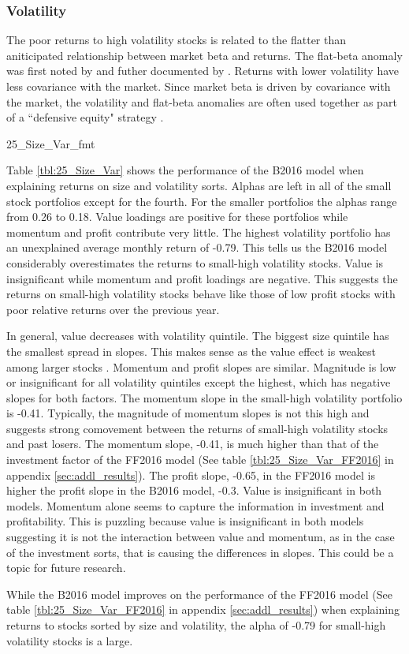 
\subsubsection{Volatility}

The poor returns to high volatility stocks is related to the flatter than aniticipated
relationship between market beta and returns. The flat-beta anomaly was first noted by
\textcite{jensen1972capital} and futher documented by \textcite{fama1973risk}. Returns
with lower volatility have less covariance with the market. Since market beta is driven by
covariance with the market, the volatility and flat-beta anomalies are often used together
as part of a ``defensive equity" strategy \parencite{frazzini2014betting}.

{25_Size_Var_fmt}

Table \ref{tbl:25_Size_Var} shows the performance of the B2016 model when
explaining returns on size and volatility sorts. Alphas are left in all of the small stock
portfolios except for the fourth. For the smaller portfolios the alphas range from 0.26 to
0.18. Value loadings are positive for these portfolios while momentum and profit
contribute very little. The highest volatility portfolio has an unexplained average
monthly return of -0.79. This tells us the B2016 model considerably overestimates the
returns to small-high volatility stocks. Value is insignificant while momentum and profit
loadings are negative. This suggests the returns on small-high volatility stocks behave
like those of low profit stocks with poor relative returns over the previous year.

In general, value decreases with volatility quintile. The biggest size quintile has the
smallest spread in slopes. This makes sense as the value effect is weakest among larger
stocks \parencite{asness2015fact}. Momentum and profit slopes are similar. Magnitude is
low or insignificant for all volatility quintiles except the highest, which has negative
slopes for both factors. The momentum slope in the small-high volatility portfolio is
-0.41. Typically, the magnitude of momentum slopes is not this high and suggests strong
comovement between the returns of small-high volatility stocks and past losers. The
momentum slope, -0.41, is much higher than that of the investment factor of the FF2016
model (See table \ref{tbl:25_Size_Var_FF2016} in appendix \ref{sec:addl_results}). The
profit slope, -0.65, in the FF2016 model is higher the profit slope in the B2016 model,
-0.3. Value is insignificant in both models. Momentum alone seems to capture the
information in investment and profitability. This is puzzling because value is
insignificant in both models suggesting it is not the interaction between value and
momentum, as in the case of the investment sorts, that is causing the differences in
slopes. This could be a topic for future research.

While the B2016 model improves on the performance of the FF2016 model (See table
\ref{tbl:25_Size_Var_FF2016} in appendix \ref{sec:addl_results}) when explaining returns
to stocks sorted by size and volatility, the alpha of -0.79 for small-high volatility
stocks is a large.